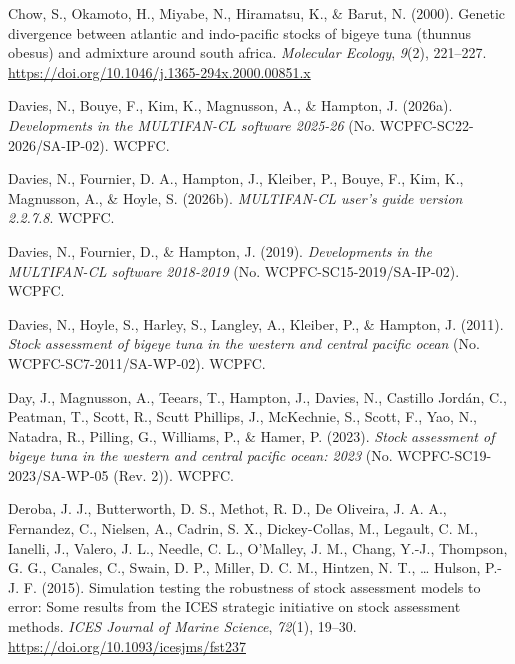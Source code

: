 \documentclass[
  english,
  a4paper,
  a4paper,
  11pt]{SCreport}
\newlength{\cslhangindent}
\newenvironment{CSLReferences}[2] %
 {\begin{list}{}{%
  \setlength{\itemindent}{0pt}
  \setlength{\leftmargin}{0pt}
  \setlength{\parsep}{0pt}
  \ifodd #1
   \setlength{\leftmargin}{\cslhangindent}
   \setlength{\itemindent}{-1\cslhangindent}
  \fi
  \setlength{\itemsep}{#2\baselineskip}}}
 {\end{list}}
\begin{document}
\begin{CSLReferences}{1}{0}
Chow, S., Okamoto, H., Miyabe, N., Hiramatsu, K., \& Barut, N. (2000).
Genetic divergence between atlantic and indo-pacific stocks of bigeye
tuna (thunnus obesus) and admixture around south africa. \emph{Molecular
Ecology}, \emph{9}(2), 221--227.
\url{https://doi.org/10.1046/j.1365-294x.2000.00851.x}

Davies, N., Bouye, F., Kim, K., Magnusson, A., \& Hampton, J. (2026a).
\emph{Developments in the {MULTIFAN}-{CL} software 2025-26} (No.
{WCPFC}-{SC}22-2026/{SA}-{IP}-02). WCPFC.

Davies, N., Fournier, D. A., Hampton, J., Kleiber, P., Bouye, F., Kim,
K., Magnusson, A., \& Hoyle, S. (2026b). \emph{{MULTIFAN}-{CL} user's
guide version 2.2.7.8}. WCPFC.

Davies, N., Fournier, D., \& Hampton, J. (2019). \emph{Developments in
the {MULTIFAN}-{CL} software 2018-2019} (No.
{WCPFC}-{SC}15-2019/{SA}-{IP}-02). WCPFC.

Davies, N., Hoyle, S., Harley, S., Langley, A., Kleiber, P., \& Hampton,
J. (2011). \emph{Stock assessment of bigeye tuna in the western and
central pacific ocean} (No. {WCPFC}-{SC}7-2011/{SA}-{WP}-02). WCPFC.

Day, J., Magnusson, A., Teears, T., Hampton, J., Davies, N., Castillo
Jordán, C., Peatman, T., Scott, R., Scutt Phillips, J., McKechnie, S.,
Scott, F., Yao, N., Natadra, R., Pilling, G., Williams, P., \& Hamer, P.
(2023). \emph{Stock assessment of bigeye tuna in the western and central
pacific ocean: 2023} (No. {WCPFC}-{SC}19-2023/{SA}-{WP}-05 (Rev. 2)).
WCPFC.

Deroba, J. J., Butterworth, D. S., Methot, R. D., De Oliveira, J. A. A.,
Fernandez, C., Nielsen, A., Cadrin, S. X., Dickey-Collas, M., Legault,
C. M., Ianelli, J., Valero, J. L., Needle, C. L., O'Malley, J. M.,
Chang, Y.-J., Thompson, G. G., Canales, C., Swain, D. P., Miller, D. C.
M., Hintzen, N. T., \ldots{} Hulson, P.-J. F. (2015). Simulation testing
the robustness of stock assessment models to error: Some results from
the {ICES} strategic initiative on stock assessment methods. \emph{ICES
Journal of Marine Science}, \emph{72}(1), 19--30.
\url{https://doi.org/10.1093/icesjms/fst237}


\end{CSLReferences}
\end{document}

